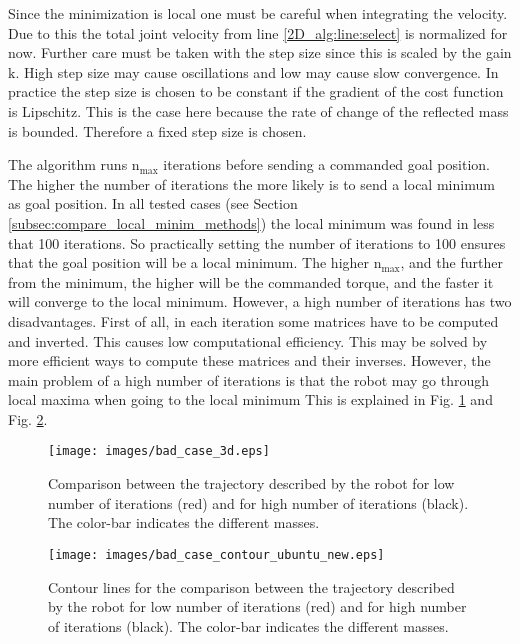 Since the minimization is local one must be careful when integrating the velocity. Due to this the total joint velocity from  line \ref{2D_alg:line:select} is normalized for now. Further care must be taken with the step size since this is scaled by the gain $\mathrm{k}$. High step size may cause oscillations and low may cause slow convergence.  In practice the step size is chosen to be constant if the gradient of the cost function is Lipschitz. This is the case here because the rate of change of the reflected mass is bounded. Therefore a fixed step size is chosen.

The algorithm runs $\mathrm{n_{max}}$ iterations before sending a commanded goal position. 
The higher the number of iterations the more likely is to send a local minimum as goal position. In all tested cases (see Section   \ref{subsec:compare_local_minim_methods})  the local minimum was found in less that 100 iterations. So practically setting the number of iterations to 100 ensures that the goal position will be a local minimum. The higher $\mathrm{n_{max}}$, and the further from the minimum, the higher will be the commanded torque, and the faster it will converge to the local minimum.
However, a high number of iterations has two disadvantages. First of all, in each iteration some matrices have to be computed and inverted. This causes low computational efficiency. This may be solved by more efficient ways to compute these matrices and their inverses. However, the main problem of a high number of iterations is that the robot may go through local maxima when going to the local minimum This is explained in Fig. \ref{fig:bad_case_3d} and Fig. \ref{fig:bad_case_contour}.\\
%
\begin{figure}[H]
	\centerline{
		\texttt{[image: images/bad\_case\_3d.eps]}}
	\caption{Comparison between the trajectory described by the robot for low number of iterations (red) and for high number of iterations (black). The color-bar indicates the different masses.}
	\label{fig:bad_case_3d}
\end{figure}
\begin{figure}[H]
	\centerline{
		\texttt{[image: images/bad\_case\_contour\_ubuntu\_new.eps]}}
	\caption{Contour lines for the comparison between the trajectory described by the robot for low number of iterations (red) and for high number of iterations (black). The color-bar indicates the different masses.}
	\label{fig:bad_case_contour}
\end{figure}
%
